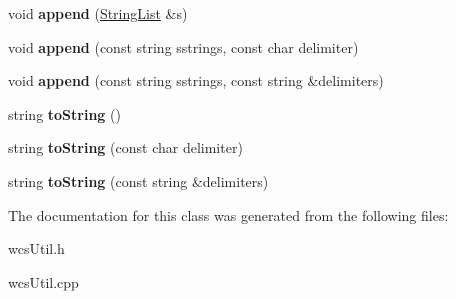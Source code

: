 \begin{DoxyCompactItemize}
\item 
\hypertarget{classStringList_a73cba9ec7e84b151b14b0d645d584e83}{
void {\bfseries append} (\hyperlink{classStringList}{StringList} \&s)}
\label{classStringList_a73cba9ec7e84b151b14b0d645d584e83}

\item 
\hypertarget{classStringList_a45a60c4a8abf4c3d158b0ebaaa2ca50b}{
void {\bfseries append} (const string sstrings, const char delimiter)}
\label{classStringList_a45a60c4a8abf4c3d158b0ebaaa2ca50b}

\item 
\hypertarget{classStringList_aaef6af7d1768fa1a7f25644db9496d67}{
void {\bfseries append} (const string sstrings, const string \&delimiters)}
\label{classStringList_aaef6af7d1768fa1a7f25644db9496d67}

\item 
\hypertarget{classStringList_a665636bbdc9d9e2ff3b397aced83761f}{
string {\bfseries toString} ()}
\label{classStringList_a665636bbdc9d9e2ff3b397aced83761f}

\item 
\hypertarget{classStringList_af7b3f9e6bfe1482f523fdbbfc8ffa3fa}{
string {\bfseries toString} (const char delimiter)}
\label{classStringList_af7b3f9e6bfe1482f523fdbbfc8ffa3fa}

\item 
\hypertarget{classStringList_a289de75e2058e06d2b96822438b1a5b4}{
string {\bfseries toString} (const string \&delimiters)}
\label{classStringList_a289de75e2058e06d2b96822438b1a5b4}

\end{DoxyCompactItemize}


The documentation for this class was generated from the following files:\begin{DoxyCompactItemize}
\item 
wcsUtil.h\item 
wcsUtil.cpp\end{DoxyCompactItemize}
